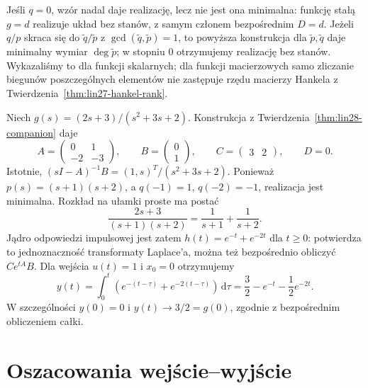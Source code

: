 \begin{uwaga}
\label{rem:lin28-constant}
Jeśli \(q=0\), wzór nadal daje realizację,
lecz nie jest ona minimalna: funkcję
stałą \(g=d\) realizuje układ bez stanów,
z samym członem bezpośrednim \(D=d\).
Jeżeli \(q/p\) skraca się do
\(\widetilde q/\widetilde p\) z
\(\gcd(\widetilde q,\widetilde p)=1\),
to powyższa konstrukcja dla
\(\widetilde p,\widetilde q\)
daje minimalny wymiar
\(\deg\widetilde p\); w stopniu \(0\)
otrzymujemy realizację bez stanów.
Wykazaliśmy to dla funkcji skalarnych;
dla funkcji macierzowych samo zliczanie
biegunów poszczególnych elementów nie
zastępuje rzędu macierzy Hankela
z Twierdzenia~\ref{thm:lin27-hankel-rank}.
\end{uwaga}

\begin{przyklad}
\label{prz:lin28-companion}
Niech \(g(s)=(2s+3)/(s^2+3s+2)\).
Konstrukcja z
Twierdzenia~\ref{thm:lin28-companion} daje
\[
 A=\begin{pmatrix}0&1\\-2&-3\end{pmatrix},
 \qquad B=\begin{pmatrix}0\\1\end{pmatrix},
 \qquad C=\begin{pmatrix}3&2\end{pmatrix},\qquad D=0.
\]
Istotnie, \((sI-A)^{-1}B
=(1,s)^T/(s^2+3s+2)\).
Ponieważ \(p(s)=(s+1)(s+2)\),
a \(q(-1)=1\), \(q(-2)=-1\),
realizacja jest minimalna.
Rozkład na ułamki proste ma postać
\[
 \frac{2s+3}{(s+1)(s+2)}
 =\frac1{s+1}+\frac1{s+2}.
\]
Jądro odpowiedzi impulsowej jest zatem
\(h(t)=e^{-t}+e^{-2t}\) dla \(t\ge0\):
potwierdza to jednoznaczność transformaty
Laplace'a, można też bezpośrednio
obliczyć \(Ce^{tA}B\).
Dla wejścia \(u(t)=1\) i \(x_0=0\) otrzymujemy
\[
 y(t)=\int_0^t(e^{-(t-\tau)}+e^{-2(t-\tau)})
 \,\mathrm d\tau
 =\frac32-e^{-t}-\frac12e^{-2t}.
\]
W szczególności \(y(0)=0\)
i \(y(t)\to3/2=g(0)\), zgodnie
z bezpośrednim obliczeniem całki.
\end{przyklad}

\section{Oszacowania wejście--wyjście}
\label{sec:lin28-bounds}

